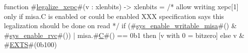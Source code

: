 function #\hyperref[sailRISCVzlegalizzezyxepc]{legalize\_xepc}#(v : xlenbits) -> xlenbits =
  /* allow writing xepc[1] only if misa.C is enabled or could be enabled 
     XXX specification says this legalization should be done on read */
  if   (#\hyperref[sailRISCVzsyszyenablezywritablezymisa]{sys\_enable\_writable\_misa}#() & #\hyperref[sailRISCVzsyszyenablezyrvc]{sys\_enable\_rvc}#()) | misa.#\hyperref[sailRISCVzC]{C}#() == 0b1
  then [v with 0 = bitzero]
  else v & #\hyperref[sailRISCVzEXTS]{EXTS}#(0b100)
